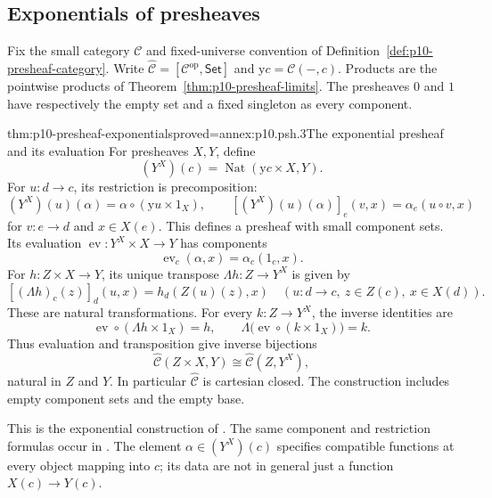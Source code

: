 
\subsection{Exponentials of presheaves}
\label{sec:p10-presheaf-exponentials}

Fix the small category \(\mathcal C\) and fixed-universe convention of
Definition~\ref{def:p10-presheaf-category}.
Write \(\widehat{\mathcal C}=[\mathcal C^{\mathrm{op}},\mathsf{Set}]\)
and \(\mathrm y c=\mathcal C(-,c)\).
Products are the pointwise products of
Theorem~\ref{thm:p10-presheaf-limits}.
The presheaves \(0\) and \(1\) have respectively the empty set
and a fixed singleton as every component.

\begin{hbtheorem}{thm:p10-presheaf-exponentials}{proved=annex:p10.psh.3}{The exponential presheaf and its evaluation}
For presheaves \(X,Y\), define
\[
                    (Y^X)(c)=
                    \operatorname{Nat}(\mathrm y c\times X,Y).
\]
For \(u:d\to c\), its restriction is precomposition:
\[
 (Y^X)(u)(\alpha)=\alpha\circ(\mathrm y u\times1_X),\qquad
 [(Y^X)(u)(\alpha)]_e(v,x)=\alpha_e(u\circ v,x)
\]
for \(v:e\to d\) and \(x\in X(e)\).
This defines a presheaf with small component sets.
Its evaluation \(\operatorname{ev}:Y^X\times X\to Y\) has components
\[
                         \operatorname{ev}_c(\alpha,x)
                                      =\alpha_c(1_c,x).
\]
For \(h:Z\times X\to Y\), its unique transpose
\(\Lambda h:Z\to Y^X\) is given by
\[
             [(\Lambda h)_c(z)]_d(u,x)=h_d(Z(u)(z),x)
               \quad(u:d\to c,\ z\in Z(c),\ x\in X(d)).
\]
These are natural transformations.  For every \(k:Z\to Y^X\),
the inverse identities are
\[
 \operatorname{ev}\circ(\Lambda h\times1_X)=h,\qquad
 \Lambda\bigl(\operatorname{ev}\circ(k\times1_X)\bigr)=k.
\]
Thus evaluation and transposition give inverse bijections
\[
 \widehat{\mathcal C}(Z\times X,Y)
                   \cong\widehat{\mathcal C}(Z,Y^X),
\]
natural in \(Z\) and \(Y\).  In particular
\(\widehat{\mathcal C}\) is cartesian closed.
The construction includes empty component sets and the empty base.
\end{hbtheorem}

This is the exponential construction of
\cite[I\S6, Proposition~1, pp.~46--47, formulas (5)--(8)]{MacLaneMoerdijk1992}.
The same component and restriction formulas occur in
\cite[\S1, pp.~4--5]{MoerdijkVanOosten2007Topos}.
The element \(\alpha\in(Y^X)(c)\) specifies compatible functions
at every object mapping into \(c\); its data are not in general
just a function \(X(c)\to Y(c)\).

